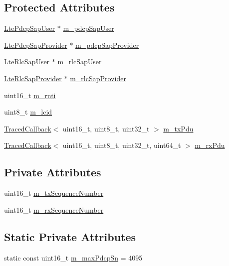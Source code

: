 \subsection*{Protected Attributes}
\begin{DoxyCompactItemize}
\item 
\hyperlink{classns3_1_1LtePdcpSapUser}{Lte\+Pdcp\+Sap\+User} $\ast$ \hyperlink{classns3_1_1LtePdcp_a3576996e2e0db8b2615ad497355c80b6}{m\+\_\+pdcp\+Sap\+User}
\item 
\hyperlink{classns3_1_1LtePdcpSapProvider}{Lte\+Pdcp\+Sap\+Provider} $\ast$ \hyperlink{classns3_1_1LtePdcp_a91b12cc4dff58b6a64c3917eb799e53f}{m\+\_\+pdcp\+Sap\+Provider}
\item 
\hyperlink{classns3_1_1LteRlcSapUser}{Lte\+Rlc\+Sap\+User} $\ast$ \hyperlink{classns3_1_1LtePdcp_a3f9062a54f55098102b01421f102cab3}{m\+\_\+rlc\+Sap\+User}
\item 
\hyperlink{classns3_1_1LteRlcSapProvider}{Lte\+Rlc\+Sap\+Provider} $\ast$ \hyperlink{classns3_1_1LtePdcp_a66730ec83f185ad90d51f588fec219ac}{m\+\_\+rlc\+Sap\+Provider}
\item 
uint16\+\_\+t \hyperlink{classns3_1_1LtePdcp_af78568f80a1641df035c0f2878d2f6f0}{m\+\_\+rnti}
\item 
uint8\+\_\+t \hyperlink{classns3_1_1LtePdcp_a48b05f78819ef7047d71f40ec08ecfa1}{m\+\_\+lcid}
\item 
\hyperlink{classns3_1_1TracedCallback}{Traced\+Callback}$<$ uint16\+\_\+t, uint8\+\_\+t, uint32\+\_\+t $>$ \hyperlink{classns3_1_1LtePdcp_a8ab5389f30d088f468632e30cbf8a725}{m\+\_\+tx\+Pdu}
\item 
\hyperlink{classns3_1_1TracedCallback}{Traced\+Callback}$<$ uint16\+\_\+t, uint8\+\_\+t, uint32\+\_\+t, uint64\+\_\+t $>$ \hyperlink{classns3_1_1LtePdcp_a7474735eca041245a0552815789f88f8}{m\+\_\+rx\+Pdu}
\end{DoxyCompactItemize}
\subsection*{Private Attributes}
\begin{DoxyCompactItemize}
\item 
uint16\+\_\+t \hyperlink{classns3_1_1LtePdcp_a4f46368bfb47f0f95fe22dc92c740b4f}{m\+\_\+tx\+Sequence\+Number}
\item 
uint16\+\_\+t \hyperlink{classns3_1_1LtePdcp_a0b2d8af5261983cd068ed0b1bdde628d}{m\+\_\+rx\+Sequence\+Number}
\end{DoxyCompactItemize}
\subsection*{Static Private Attributes}
\begin{DoxyCompactItemize}
\item 
static const uint16\+\_\+t \hyperlink{classns3_1_1LtePdcp_a80ebfa4d232fb2d6826aefe1fba4b09f}{m\+\_\+max\+Pdcp\+Sn} = 4095
\end{DoxyCompactItemize}
